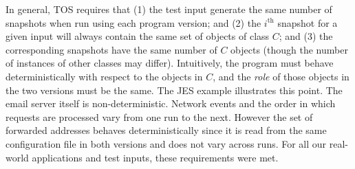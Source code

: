 \documentclass[natbib,10pt]{sigplanconf}
\newcommand{\TOS}{TOS\xspace}
\begin{document}
In general, \TOS requires that (1)  the test input generate the same number of
snapshots when run using each program version; and (2)  the
$i^\text{th}$ snapshot for a given input will always contain the same
set of objects of class $C$; and (3)  the corresponding
snapshots have the same number of $C$ objects
(though the number of instances of other classes may differ).  Intuitively,
the program must behave deterministically with respect to the objects
in $C$, and the \emph{role} of those objects in the two versions
must be the same.  The JES example illustrates this
point.  The email server itself is non-deterministic.  Network events
and the order in which requests are processed vary from one run to
the next.  However the set of forwarded addresses behaves
deterministically since it is read from the same configuration file in
both versions and 
does not vary across runs.  For all our real-world applications and
test inputs, these requirements were met.
\end{document}
